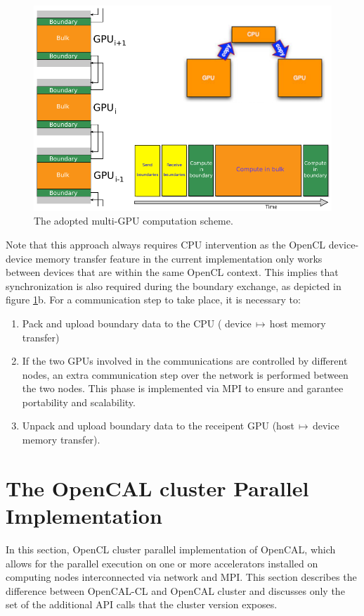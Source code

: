 \begin{figure}
	\centering
		\includegraphics[width=1.0\textwidth]{./images/opencal/multigpu_naive_exchange.png}
		\caption{The adopted multi-GPU computation scheme.}
		\label{fig:multigpu_naive_exchange}
\end{figure}


Note that this approach always requires CPU intervention as the OpenCL device-device memory transfer feature in the current implementation only works between devices that are within the same OpenCL context. This implies that synchronization is also required during the boundary exchange, as depicted in figure \ref{fig:multigpu_naive_exchange}b.
For a communication step to take place, it is necessary to:
\begin{enumerate}
	\item Pack and upload boundary data to the CPU ( device$\,\mapsto\,$host  memory transfer)
	\item If the two GPUs involved in the communications are controlled by different nodes, an extra communication step over the network is performed between the two nodes. This phase is implemented via MPI \cite{mpiStandard:1994} to ensure and garantee portability and scalability. 
	\item Unpack and upload boundary data to the receipent GPU (host$\,\mapsto\,$device memory transfer).
\end{enumerate}


\section{The OpenCAL cluster Parallel Implementation}
  In this section, OpenCL cluster parallel implementation
of OpenCAL, which allows for the parallel execution on one or more accelerators installed on computing nodes interconnected via network and MPI.
This section describes the difference between OpenCAL-CL and OpenCAL cluster and discusses only the set of the additional API calls that the cluster version exposes. 

